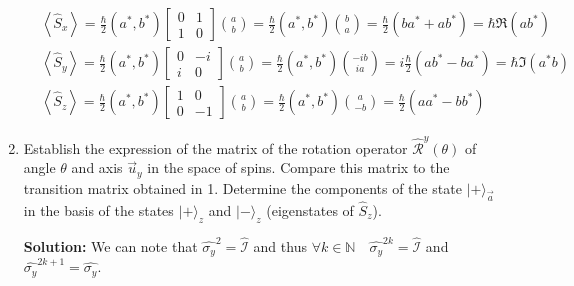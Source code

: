 \documentclass{article}
\begin{document}
\begin{enumerate}
{    $$
    \begin{aligned}
    & \left\langle\hat{S}_{x}\right\rangle = \frac{\hbar}{2}\left(a^{*}, b^{*}\right)\left[\begin{array}{cc}
    0 & 1 \\
    1 & 0
    \end{array}\right]\binom{a}{b} = \frac{\hbar}{2}\left(a^{*}, b^{*}\right)\binom{b}{a} = \frac{\hbar}{2}\left(b a^{*} + a b^{*}\right) = \hbar \Re\left(a b^{*}\right) \\
    & \left\langle\hat{S}_{y}\right\rangle = \frac{\hbar}{2}\left(a^{*}, b^{*}\right)\left[\begin{array}{cc}
    0 & -i \\
    i & 0
    \end{array}\right]\binom{a}{b} = \frac{\hbar}{2}\left(a^{*}, b^{*}\right)\binom{-i b}{i a} = i \frac{\hbar}{2}\left(a b^{*} - b a^{*}\right) = \hbar \Im\left(a^{*} b\right) \\
    & \left\langle\hat{S}_{z}\right\rangle = \frac{\hbar}{2}\left(a^{*}, b^{*}\right)\left[\begin{array}{cc}
    1 & 0 \\
    0 & -1
    \end{array}\right]\binom{a}{b} = \frac{\hbar}{2}\left(a^{*}, b^{*}\right)\binom{a}{-b} = \frac{\hbar}{2}\left(a a^{*} - b b^{*}\right)
    \end{aligned}
    $$}

    \item Establish the expression of the matrix of the rotation operator $\hat{\mathcal{R}}^{y}(\theta)$ of angle $\theta$ and axis $\vec{u}_{y}$ in the space of spins. Compare this matrix to the transition matrix obtained in 1. Determine the components of the state $|+\rangle_{\vec{a}}$ in the basis of the states $|+\rangle_{z}$ and $|-\rangle_{z}$ (eigenstates of $\hat{S}_{z}$).

    {\color{red}\textbf{Solution:} We can note that $\hat{\sigma_{y}}^{2} = \hat{\mathcal{I}}$ and thus $\forall k \in \mathbb{N} \quad \hat{\sigma_{y}}^{2 k} = \hat{\mathcal{I}}$ and $\hat{\sigma_{y}}^{2 k+1} = \hat{\sigma_{y}}$.

}
\end{enumerate}
\end{document}
